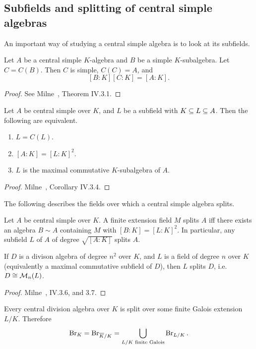 \subsection{Subfields and splitting of central simple algebras}
An important way of studying a central simple algebra is to look at its subfields.
\begin{thm}
Let $A$ be a central simple $K$-algebra and $B$ be a simple $K$-subalgebra. Let $C=C(B)$. Then $C$ is simple, $C(C)=A$, and
\[
[B:K][C:K]=[A:K].
\]
\end{thm}
\begin{proof}
See Milne~\cite{Mi08}, Theorem IV.3.1.
\end{proof}
\begin{cor}
Let $A$ be central simple over $K$, and $L$ be a subfield with $K\subeq L\subeq A$. Then the following are equivalent.
\begin{enumerate}
\item
$L=C(L)$.
\item
$[A:K]=[L:K]^2$.
\item
$L$ is the maximal commutative $K$-subalgebra of $A$.
\end{enumerate}
\end{cor}
\begin{proof}
Milne~\cite{Mi08}, Corollary IV.3.4.
\end{proof}
The following describes the fields over which a central simple algebra splits.
\begin{cor}
Let $A$ be central simple over $K$. A finite extension field $M$ splits $A$ iff there exists an algebra $B\sim A$ containing $M$ with $[B:K]=[L:K]^2$. In particular, any subfield $L$ of $A$ of degree $\sqrt{[A:K]}$ splits $A$.

If $D$ is a divison algebra of degree $n^2$ over $K$, and $L$ is a field of degree $n$ over $K$ (equivalently a maximal commutative subfield of $D$), then $L$ splits $D$, i.e. $D\cong \cal M_n(L)$.
\end{cor}
\begin{proof}
Milne~\cite{Mi08}, IV.3.6, and 3.7.
\end{proof}
\begin{thm}
Every central division algebra over $K$ is split over some finite Galois extension $L/K$. Therefore
\[
\Br_K=\Br_{\ol K/K}=\bigcup_{L/K\text{ finite Galois}} \Br_{L/K}.
\]
\end{thm}
